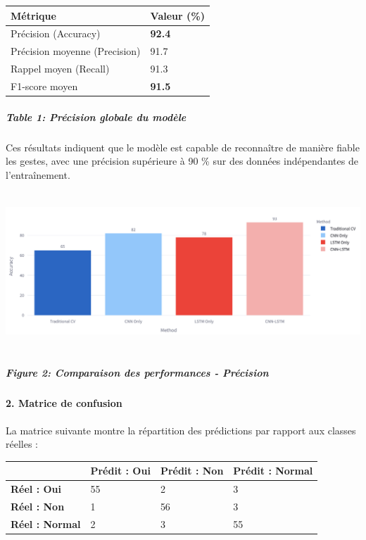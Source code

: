 \documentclass[
]{article}
\begin{document}
\begin{longtable}[]{@{}ll@{}}
\toprule
\textbf{Métrique} & \textbf{Valeur (\%)} \\
\midrule
\endhead
Précision (Accuracy) & \textbf{92.4} \\
Précision moyenne (Precision) & 91.7 \\
Rappel moyen (Recall) & 91.3 \\
F1-score moyen & \textbf{91.5} \\
\bottomrule
\end{longtable}

\hypertarget{table-1-pruxe9cision-globale-du-moduxe8le}{%
\subparagraph{Table 1: Précision globale du modèle}\label{table-1-pruxe9cision-globale-du-moduxe8le}}

Ces résultats indiquent que le modèle est capable de reconnaître de manière fiable les gestes, avec une précision supérieure à 90 \% sur des données indépendantes de l'entraînement.

\includegraphics[width=6.5in,height=2.33333in]{0528136f-968b-4a39-becd-3323677c0324_media/media/image1.png}

\hypertarget{figure-2-comparaison-des-performances---pruxe9cision}{%
\subparagraph{Figure 2: Comparaison des performances - Précision}\label{figure-2-comparaison-des-performances---pruxe9cision}}

\hypertarget{matrice-de-confusion}{%
\paragraph{\texorpdfstring{\textbf{2. Matrice de confusion}}{2. Matrice de confusion}}\label{matrice-de-confusion}}

La matrice suivante montre la répartition des prédictions par rapport aux classes réelles :

\begin{longtable}[]{@{}llll@{}}
\toprule
& \textbf{Prédit : Oui} & \textbf{Prédit : Non} & \textbf{Prédit : Normal} \\
\midrule
\endhead
\textbf{Réel : Oui} & 55 & 2 & 3 \\
\textbf{Réel : Non} & 1 & 56 & 3 \\
\textbf{Réel : Normal} & 2 & 3 & 55 \\
\bottomrule
\end{longtable}
\end{document}
